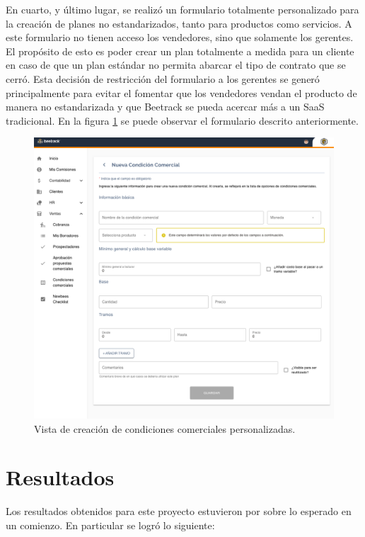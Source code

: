 
    En cuarto, y último lugar, se realizó un formulario totalmente personalizado para la creación de planes no estandarizados, tanto para productos como servicios. A este formulario no tienen acceso los vendedores, sino que solamente los gerentes. El propósito de esto es poder crear un plan totalmente a medida para un cliente en caso de que un plan estándar no permita abarcar el tipo de contrato que se cerró. Esta decisión de restricción del formulario a los gerentes se generó principalmente para evitar el fomentar que los vendedores vendan el producto de manera no estandarizada y que Beetrack se pueda acercar más a un SaaS tradicional. En la figura \ref{fig:cc_new_manager} se puede observar el formulario descrito anteriormente.
 
    \begin{figure}[H]
      \centering
      \includegraphics[width=0.8\linewidth]{figures/cc/vistas/cc_new_manager.png}
      \caption{Vista de creación de condiciones comerciales personalizadas.}
      \label{fig:cc_new_manager}
    \end{figure}

\section{Resultados}

  Los resultados obtenidos para este proyecto estuvieron por sobre lo esperado en un comienzo. En particular se logró lo siguiente:

